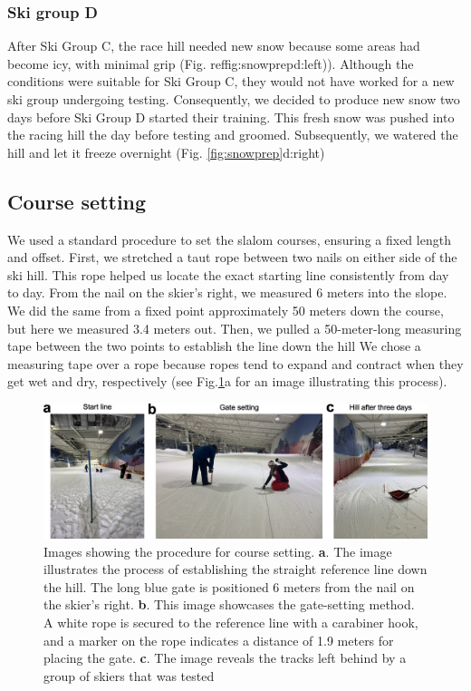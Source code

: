 \documentclass{article}
\begin{document}
\subsubsection*{Ski group D}
After Ski Group C, the race hill needed new snow because some areas had become icy, with minimal grip (Fig. ref{fig:snowprep}d:left)). Although the conditions were suitable for Ski Group C, they would not have worked for a new ski group undergoing testing. Consequently, we decided to produce new snow two days before Ski Group D started their training. This fresh snow was pushed into the racing hill the day before testing and groomed. Subsequently, we watered the hill and let it freeze overnight (Fig. \ref{fig:snowprep}d:right)


\subsection{Course setting}\label{sup_coursesetting}
We used a standard procedure to set the slalom courses, ensuring a fixed length and offset. First, we stretched a taut rope between two nails on either side of the ski hill. This rope helped us locate the exact starting line consistently from day to day. From the nail on the skier's right, we measured 6 meters into the slope. We did the same from a fixed point approximately 50 meters down the course, but here we measured 3.4 meters out. Then, we pulled a 50-meter-long measuring tape between the two points to establish the line down the hill   We chose a measuring tape over a rope because ropes tend to expand and contract when they get wet and dry, respectively (see Fig.\ref{fig:coursesetting}a for an image illustrating this process).

\begin{figure}[H]
\centering
\includegraphics[width=\linewidth]{figures/figure_appendix_coursesetting.jpg}
\caption{Images showing the procedure for course setting. \textbf{a}. The image illustrates the process of establishing the straight reference line down the hill. The long blue gate is positioned 6 meters from the nail on the skier's right. \textbf{b}. This image showcases the gate-setting method. A white rope is secured to the reference line with a carabiner hook, and a marker on the rope indicates a distance of 1.9 meters for placing the gate. \textbf{c}. The image reveals the tracks left behind by a group of skiers that was tested
}
\label{fig:coursesetting}
\end{figure}
 
\end{document}
